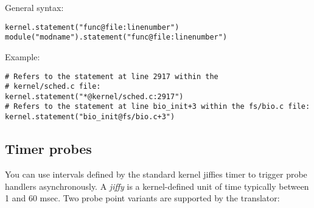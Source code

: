 \documentclass[twoside,english]{article}
\newenvironment{vindent}
{\begin{list}{}{\setlength{\listparindent}{6pt}}
\item[]}
{\end{list}}
\begin{document}
General syntax:

\begin{vindent}
\begin{verbatim}
kernel.statement("func@file:linenumber")
module("modname").statement("func@file:linenumber")
\end{verbatim}
\end{vindent}
Example:

\begin{vindent}
\begin{verbatim}
# Refers to the statement at line 2917 within the
# kernel/sched.c file:
kernel.statement("*@kernel/sched.c:2917")
# Refers to the statement at line bio_init+3 within the fs/bio.c file:
kernel.statement("bio_init@fs/bio.c+3")
\end{verbatim}
\end{vindent}

\begin{comment}
\subsection{Marker probes}

This family of probe points connects to static probe markers inserted into
the kernel or a module. These markers are special macro calls in the kernel
that make probing faster and more reliable than with DWARF-based probes.
DWARF debugging information is not required to use probe markers.

Marker probe points begin with a kernel or module(\char`\"{}\emph{name}\char`\"{})
prefix, the same as DWARF probes. This prefix identifies the source of the
symbol table used for finding markers. The suffix names the marker itself:
mark(\char`\"{}\emph{name}\char`\"{}). The marker name string, which may
contain wildcard characters, is matched against the names given to the marker
macros when the kernel or module was compiled.

The handler associated with a marker probe reads any optional parameters
specified at the macro call site named \$arg1 through \$argNN, where NN is
the number of parameters supplied by the macro. Number and string parameters
are passed in a type-safe manner.
\end{comment}

\subsection{Timer probes}
You can use intervals defined by the standard kernel jiffies
timer to trigger probe handlers asynchronously. A \emph{jiffy} is a kernel-defined
unit of time typically between 1 and 60 msec. Two probe point variants are
supported by the translator: 
\end{document}
